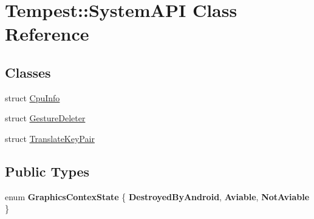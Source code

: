 \hypertarget{class_tempest_1_1_system_a_p_i}{\section{Tempest\+:\+:System\+A\+P\+I Class Reference}
\label{class_tempest_1_1_system_a_p_i}
}
\subsection*{Classes}
\begin{DoxyCompactItemize}
\item 
struct \hyperlink{struct_tempest_1_1_system_a_p_i_1_1_cpu_info}{Cpu\+Info}
\item 
struct \hyperlink{struct_system_a_p_i_1_1_gesture_deleter}{Gesture\+Deleter}
\item 
struct \hyperlink{struct_tempest_1_1_system_a_p_i_1_1_translate_key_pair}{Translate\+Key\+Pair}
\end{DoxyCompactItemize}
\subsection*{Public Types}
\begin{DoxyCompactItemize}
\item 
\hypertarget{class_tempest_1_1_system_a_p_i_a5dabe290e1b12a62a918107cce79f992}{enum {\bfseries Graphics\+Contex\+State} \{ {\bfseries Destroyed\+By\+Android}, 
{\bfseries Aviable}, 
{\bfseries Not\+Aviable}
 \}}\label{class_tempest_1_1_system_a_p_i_a5dabe290e1b12a62a918107cce79f992}

\end{DoxyCompactItemize}
